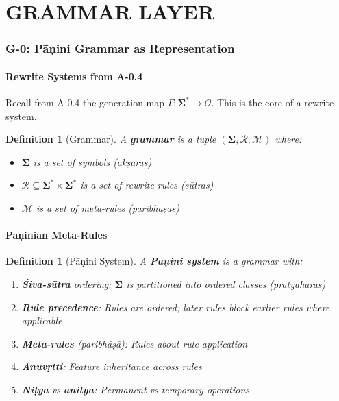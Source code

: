\documentclass[12pt, oneside]{article}
\newtheorem{definition}[theorem]{Definition}
\newcommand{\Opr}{\mathcal{O}}
\newcommand{\Sg}{\mathbf{\Sigma}}
\begin{document}
\newpage

\part{GRAMMAR LAYER}

\section{G-0: Pāṇini Grammar as Representation}

\subsection{Rewrite Systems from A-0.4}

Recall from A-0.4 the generation map $\Gamma: \Sg^* \rightarrow \Opr$. This is the core of a rewrite system.

\begin{definition}[Grammar]
A \textbf{grammar} is a tuple $(\Sg, \mathcal{R}, \mathcal{M})$ where:
\begin{itemize}
    \item $\Sg$ is a set of symbols (akṣaras)
    \item $\mathcal{R} \subseteq \Sg^* \times \Sg^*$ is a set of rewrite rules (sūtras)
    \item $\mathcal{M}$ is a set of meta-rules (paribhāṣās)
\end{itemize}
\end{definition}

\subsection{Pāṇinian Meta-Rules}

\begin{definition}[Pāṇini System]
A \textbf{Pāṇini system} is a grammar with:
\begin{enumerate}
    \item \textbf{Śiva-sūtra} ordering: $\Sg$ is partitioned into ordered classes (pratyāhāras)
    \item \textbf{Rule precedence}: Rules are ordered; later rules block earlier rules where applicable
    \item \textbf{Meta-rules} (paribhāṣā): Rules about rule application
    \item \textbf{Anuvṛtti}: Feature inheritance across rules
    \item \textbf{Niṭya} vs \textbf{anitya}: Permanent vs temporary operations
\end{enumerate}
\end{definition}
\end{document}
